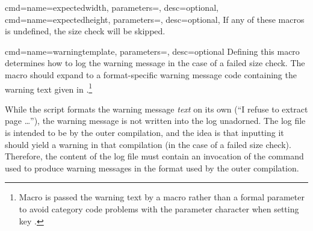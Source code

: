 \documentclass[a4paper,11pt]{article}
\begin{document}
\begin{doc}
\begin{doc}{
      cmd={name=expectedwidth, parameters=, desc=optional},
      cmd={name=expectedheight, parameters=, desc=optional},
    }
    If any of these macros is undefined, the size check will be skipped.
  \end{doc}
  \begin{doc}{cmd={name=warningtemplate, parameters=, desc=optional}}
    Defining this macro determines how to log the warning message in the case
    of a failed size check.  The macro should expand to a 
    format-specific warning message code containing the warning text given in
    .\footnote{Macro  is passed
      the warning text by a macro rather than a formal parameter to avoid
      category code problems with the parameter character when setting key
      .}

    While the script formats the warning message \emph{text} on its own (``I
    refuse to extract page \dots''), the warning message is not written into
    the log unadorned.  The log file is intended to be  by the outer
     compilation, and the idea is that inputting it should yield a
    warning in that compilation (in the case of a failed size
    check). Therefore, the content of the log file must contain an invocation
    of the command used to produce warning messages in the  format
    used by the outer compilation.


\end{doc}
\end{doc}
\end{document}
